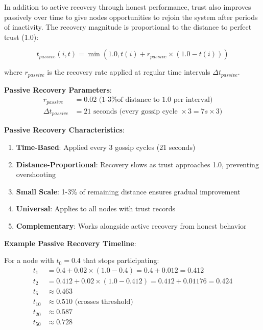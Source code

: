 \documentclass[12pt,a4paper]{article}
\begin{document}
In addition to active recovery through honest performance, trust also improves passively over time to give nodes opportunities to rejoin the system after periods of inactivity. The recovery magnitude is proportional to the distance to perfect trust (1.0):

\begin{equation}
    t_{passive}(i, t) = \min(1.0, t(i) + r_{passive} \times (1.0 - t(i)))
\end{equation}

where $r_{passive}$ is the recovery rate applied at regular time intervals $\Delta t_{passive}$.

\textbf{Passive Recovery Parameters}:
\begin{align}
    r_{passive} &= 0.02 \text{ (1-3\% of distance to 1.0 per interval)} \\
    \Delta t_{passive} &= 21 \text{ seconds (every gossip cycle } \times 3 = 7s \times 3)
\end{align}

\textbf{Passive Recovery Characteristics}:
\begin{enumerate}
    \item \textbf{Time-Based}: Applied every 3 gossip cycles (21 seconds)
    \item \textbf{Distance-Proportional}: Recovery slows as trust approaches 1.0, preventing overshooting
    \item \textbf{Small Scale}: 1-3\% of remaining distance ensures gradual improvement
    \item \textbf{Universal}: Applies to all nodes with trust records
    \item \textbf{Complementary}: Works alongside active recovery from honest behavior
\end{enumerate}

\textbf{Example Passive Recovery Timeline}:

For a node with $t_0 = 0.4$ that stops participating:
\begin{align}
    t_1 &= 0.4 + 0.02 \times (1.0 - 0.4) = 0.4 + 0.012 = 0.412 \\
    t_2 &= 0.412 + 0.02 \times (1.0 - 0.412) = 0.412 + 0.01176 = 0.424 \\
    t_5 &\approx 0.463 \\
    t_{10} &\approx 0.510 \text{ (crosses threshold)} \\
    t_{20} &\approx 0.587 \\
    t_{50} &\approx 0.728
\end{align}
\end{document}
